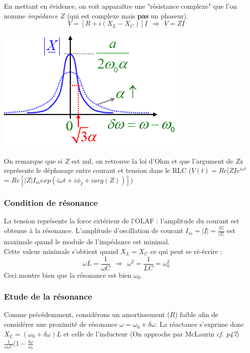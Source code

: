 \documentclass	[11pt, a4paper, openany]{book}
\begin{document}
	En mettant en évidence, on voit apparaître une "résistance complexe" que l'on nomme \textit{impédance} $Z$ (qui est complexe mais \textbf{pas} un phaseur).
	\begin{equation}
		\underline{V} = \left[R + i\left(X_L - X_C\right)\right]\underline{I}\ \ \Rightarrow\ \ \underline{V} = Z\underline{I}
	\end{equation}
	\begin{center}
		\includegraphics[scale=0.5]{oo/image18.png}
	\end{center}
	On remarque que si $Z$ est nul, on retrouve la loi d'Ohm et que l'argument de $Z$z représente le déphasage entre courant et tension dans le RLC ($V(t) = Re[Z\underline{I}e^{i\omega t}$ = $Re[|Z|I_m exp(i\omega t + i\phi_I + i arg(Z))]$)
		
		\subsubsection{Condition de résonance}
		La tension représente la force extérieur de l'OLAF : l'amplitude du courant est obtenue à la résonance. L'amplitude d'oscillation de courant $I_m = |\underline{I}| = \frac{|\underline{V}|}{|\underline{Z}|}$ est maximale quand le module de l'impédance est minimal.\\
		Cette valeur minimale s'obtient quand $X_L = X_C$ ce qui peut se ré-écrire :
		\begin{equation}
			\omega L = \frac{1}{\omega C}\ \ \Rightarrow\ \ \omega^2 = \frac{1}{LC} = \omega_0^2
		\end{equation}
		Ceci montre bien que la résonance est bien $\omega_0$.
		
		\subsubsection{Etude de la résonance}
		Comme précédemment, considérons un amortissement ($R$) faible afin de considérer une proximité de résonance $\omega = \omega_0 + \delta\omega$. La réactance s'exprime donc $X_L = (\omega_0 + \delta\omega)L$ et celle de l'inducteur (On approche par McLaurin \textit{cf. p47}) $\frac{1}{\omega_0 C}(1-\frac{\delta\omega}{\omega_0}$\\
		
\end{document}
